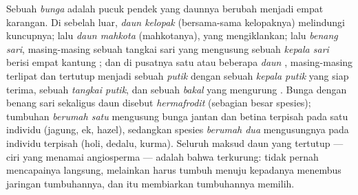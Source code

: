 \begin{definition}\label{def:b2:angiosperm-reproduction:flower}
Sebuah \emph{bunga} adalah pucuk pendek yang daunnya berubah menjadi
empat karangan. Di sebelah luar, \emph{daun kelopak} (bersama-sama
kelopaknya) melindungi kuncupnya; lalu \emph{daun mahkota} (mahkotanya),
yang mengiklankan; lalu \emph{benang sari}, masing-masing sebuah tangkai
sari yang mengusung sebuah \emph{kepala sari} berisi empat kantung
; dan di pusatnya satu atau beberapa \emph{daun },
masing-masing terlipat dan tertutup menjadi sebuah \emph{putik} dengan
sebuah \emph{kepala putik} yang siap terima, sebuah \emph{tangkai
putik}, dan sebuah \emph{bakal } yang mengurung
\emph{}. Bunga dengan benang sari sekaligus daun 
disebut \emph{hermafrodit} (sebagian besar spesies); tumbuhan
\emph{berumah satu} mengusung bunga jantan dan betina terpisah pada
satu individu (jagung, ek, hazel), sedangkan spesies \emph{berumah dua}
mengusungnya pada individu terpisah (holi, dedalu, kurma). Seluruh
maksud daun  yang tertutup --- ciri yang menamai angiosperma ---
adalah bahwa  terkurung:  tidak pernah
mencapainya langsung, melainkan harus tumbuh menuju kepadanya menembus
jaringan tumbuhannya, dan itu membiarkan tumbuhannya memilih.
\end{definition}

